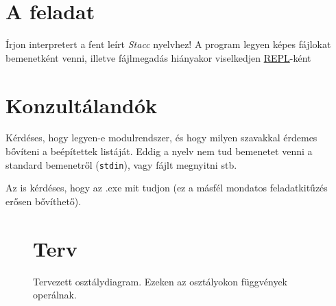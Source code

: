 \documentclass[a4paper]{article}
\newcommand{\stacc}{{\it Stacc }}
\begin{document}
\section*{A feladat}
Írjon interpretert a fent leírt \stacc nyelvhez! A program legyen képes fájlokat bemenetként venni, illetve fájlmegadás hiányakor viselkedjen \href{https://en.wikipedia.org/wiki/Read-eval-print_loop}{REPL}-ként

\section*{Konzultálandók}

Kérdéses, hogy legyen-e modulrendszer, és hogy milyen szavakkal érdemes bővíteni a beépítettek listáját. Eddig a nyelv nem tud bemenetet venni a standard bemenetről (\verb|stdin|), vagy fájlt megnyitni stb.

Az is kérdéses, hogy az .exe mit tudjon (ez a másfél mondatos feladatkitűzés erősen bővíthető).

\pagebreak

\begin{figure}[h]
\section*{Terv}
\centering
\caption{Tervezett osztálydiagram. Ezeken az osztályokon függvények operálnak.}
\end{figure}
\end{document}

